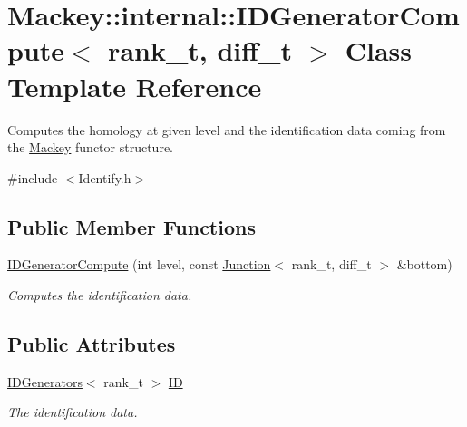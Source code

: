 \hypertarget{classMackey_1_1internal_1_1IDGeneratorCompute}{}\section{Mackey\+:\+:internal\+:\+:I\+D\+Generator\+Compute$<$ rank\+\_\+t, diff\+\_\+t $>$ Class Template Reference}
\label{classMackey_1_1internal_1_1IDGeneratorCompute}


Computes the homology at given level and the identification data coming from the \hyperlink{namespaceMackey}{Mackey} functor structure.  




{\ttfamily \#include $<$Identify.\+h$>$}

\subsection*{Public Member Functions}
\begin{DoxyCompactItemize}
\item 
\hyperlink{classMackey_1_1internal_1_1IDGeneratorCompute_a39700cf08ba57766c87498975b28ec62}{I\+D\+Generator\+Compute} (int level, const \hyperlink{classMackey_1_1Junction}{Junction}$<$ rank\+\_\+t, diff\+\_\+t $>$ \&bottom)
\begin{DoxyCompactList}\small\item\em Computes the identification data. \end{DoxyCompactList}\end{DoxyCompactItemize}
\subsection*{Public Attributes}
\begin{DoxyCompactItemize}
\item 
\hyperlink{classMackey_1_1IDGenerators}{I\+D\+Generators}$<$ rank\+\_\+t $>$ \hyperlink{classMackey_1_1internal_1_1IDGeneratorCompute_ac8a78b5df8d06e1e20e5f6028ee20428}{ID}
\begin{DoxyCompactList}\small\item\em The identification data. \end{DoxyCompactList}\end{DoxyCompactItemize}
